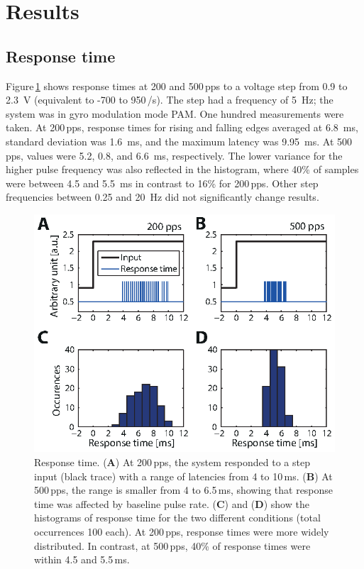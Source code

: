 \section{Results}
\subsection{Response time}
Figure\,\ref{fig:crio:response} shows response times at 200 and 500\,pps to a voltage step from 0.9 to \SI{2.3}{\volt} (equivalent to -700 to 950\,\degree /s). The step had a frequency of \SI{5}{\hertz}; the system was in gyro modulation mode PAM. One hundred measurements were taken. At 200\,pps, response times for rising and falling edges averaged at \SI{6.8}{\milli\second}, standard deviation was \SI{1.6}{\milli\second}, and the maximum latency was \SI{9.95}{\milli\second}. At 500\,pps, values were 5.2, 0.8, and \SI{6.6}{\milli\second}, respectively. The lower variance for the higher pulse frequency was also reflected in the histogram, where 40\% of samples were between 4.5 and \SI{5.5}{\milli\second} in contrast to 16\% for 200\,pps. Other step frequencies between 0.25 and \SI{20}{\hertz} did not significantly change results.
\begin{figure}[btp]
\centering
\includegraphics{chapters/partii/crio/figures/Fig_CRIO_response.eps} 
\caption[CompactRIO response times]{Response time. (\textbf{A}) At 200\,pps, the system responded to a step input (black trace) with a range of latencies from 4 to 10\,ms. (\textbf{B}) At 500\,pps, the range is smaller from 4 to 6.5\,ms, showing that response time was affected by baseline pulse rate. (\textbf{C}) and (\textbf{D}) show the histograms of response time for the two different conditions (total occurrences 100 each). At 200\,pps, response times were more widely distributed. In contrast, at 500\,pps, 40\% of response times were within 4.5 and 5.5\,ms.}
\label{fig:crio:response}
\end{figure}

